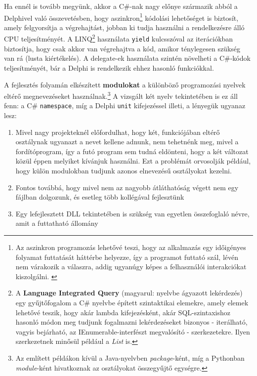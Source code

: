 \documentclass[tocnopagenum]{thesis-ekf}
\theoremstyle{definition}
\theoremstyle{remark}
\begin{document}
	Ha ennél is tovább megyünk, akkor a C\#-nak nagy előnye származik abból a Delphivel való összevetésben, hogy aszinkron\footnote{ Az aszinkron programozás lehetővé teszi, hogy az alkalmazás egy időigényes folyamat futtatását háttérbe helyezze, így a programot futtató szál, lévén nem várakozik a válaszra, addig ugyanúgy képes a felhasználói interakciókat kiszolgálni. \cite{async}} kódolási lehetőséget is biztosít, amely felgyorsítja a végrehajtást, jobban ki tudja használni a rendelkezésre álló CPU teljesítményét. A LINQ\footnote{A \textbf{Language Integrated Query} (magyarul: nyelvbe ágyazott lekérdezés) egy gyűjtőfogalom a C\# nyelvbe épített szintaktikai elemekre, amely elemek lehetővé teszik, hogy akár lambda kifejezésként, akár SQL-szintaxishoz hasonló módon meg tudjunk fogalmazni lekérdezéseket bizonyos - iterálható, vagyis bejárható, az IEnumerable-interfészt megvalósító - szerkezetekre. Ilyen szerkezetnek minősül például a \textit{List} is.} használata \verb|yield| kulcsszóval az iterációkban biztosítja, hogy csak akkor van végrehajtva a kód, amikor ténylegesen szükség van rá (lusta kiértékelés). A delegate-ek használata szintén növelheti a C\#-kódok teljesítményét, bár a Delphi is rendelkezik ehhez hasonló funkciókkal.
	\cite{perf_comp}
	
	A fejlesztés folyamán elkészített \textbf{modulokat} a különböző programozási nyelvek eltérő megnevezéseket használnak.\footnote{Az említett példákon kívül a Java-nyelvben \textit{package}-ként, míg a Pythonban \textit{module}-ként hivatkoznak az osztályokat összegyűjtő egységre.} A vizsgált két nyelv tekintetében is ez áll fenn: a C\# \verb|namespace|, míg a Delphi \verb|unit| kifejezéssel illeti, a lényegük ugyanaz lesz: 
	\begin{enumerate}
		\item Mivel nagy projekteknél előfordulhat, hogy két, funkciójában eltérő osztálynak ugyanazt a nevet kellene adnunk, nem tehetnénk meg, mivel a fordítóprogram, így a futó program sem tudná eldönteni, hogy a két változat közül éppen melyiket kívánjuk használni. Ezt a problémát orvosolják például, hogy külön modulokban tudjunk azonos elnevezésű osztályokat kezelni.
		\item Fontos továbbá, hogy mivel nem az nagyobb átláthatóság végett nem egy fájlban dolgozunk, és esetleg több kollégával fejlesztünk 
		\item Egy lefejlesztett DLL tekintetében is szükség van egyetlen összefoglaló névre, amit a futtatható állomány
	\end{enumerate}
	
\end{document}
